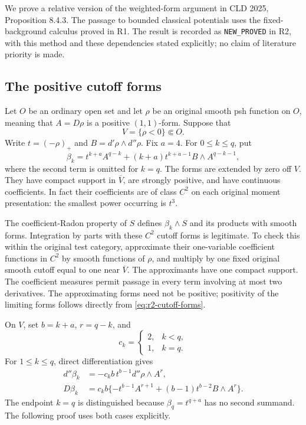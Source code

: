 \documentclass[11pt,a4paper]{article}
\numberwithin{equation}{section}
\theoremstyle{definition}
\theoremstyle{remark}
\begin{document}
We prove a relative version of the weighted-form argument in
CLD 2025, Proposition 8.4.3. The passage to bounded classical
potentials uses the fixed-background calculus proved in R1. The
result is recorded as \texttt{NEW\_PROVED} in R2, with this method
and these dependencies stated explicitly; no claim of literature
priority is made.

\subsection{The positive cutoff forms}

Let $O$ be an ordinary open set and let $\rho$ be an original smooth
psh function on $O$, meaning that $A=D\rho$ is a positive
$(1,1)$-form. Suppose that
\[
 V=\{\rho<0\}\Subset O.
\]
Write $t=(-\rho)_+$ and $B=d'\rho\wedge d''\rho$. Fix $a=4$.
For $0\leq k\leq q$, put
\begin{equation}
\label{eq:r2-cutoff-forms}
 \beta_k=t^{k+a}A^{q-k}
       +(k+a)t^{k+a-1}B\wedge A^{q-k-1},
\end{equation}
where the second term is omitted for $k=q$. The forms are extended
by zero off $V$. They have compact support in $\overline V$, are
strongly positive, and have continuous coefficients. In fact their
coefficients are of class $C^2$ on each original moment presentation:
the smallest power occurring is $t^3$.

The coefficient-Radon property of $S$ defines $\beta_k\wedge S$ and
its products with smooth forms. Integration by parts with these
$C^2$ cutoff forms is legitimate. To check this within the original
test category, approximate their one-variable coefficient functions
in $C^2$ by smooth functions of $\rho$, and multiply by one fixed
original smooth cutoff equal to one near $\overline V$.
The approximants have one compact support. The coefficient measures
permit passage in every term involving at most two derivatives.
The approximating forms need not be positive; positivity of the
limiting forms follows directly from \eqref{eq:r2-cutoff-forms}.

On $V$, set $b=k+a$, $r=q-k$, and
\[
 c_k=\begin{cases}2,&k<q,\\1,&k=q.\end{cases}
\]
For $1\leq k\leq q$, direct differentiation gives
\begin{align}
 d''\beta_k
   &=-c_k b\,t^{b-1}d''\rho\wedge A^r,
       \label{eq:r2-dbeta}\\
 D\beta_k
   &=c_k b\{-t^{b-1}A^{r+1}
                 +(b-1)t^{b-2}B\wedge A^r\}.
       \label{eq:r2-ddbeta}
\end{align}
The endpoint $k=q$ is distinguished because $\beta_q=t^{q+a}$
has no second summand. The following proof uses both cases explicitly.
\end{document}
